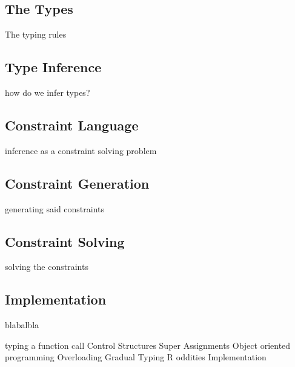\subsection{The Types}

The typing rules

\subsection{Type Inference}

how do we infer types?

\subsection{Constraint Language}

inference as a constraint solving problem

\subsection{Constraint Generation}

generating said constraints

\subsection{Constraint Solving}

solving the constraints

\subsection{Implementation}


blabalbla

typing a function call
Control Structures
Super Assignments
Object oriented programming
Overloading
Gradual Typing
R oddities
Implementation
